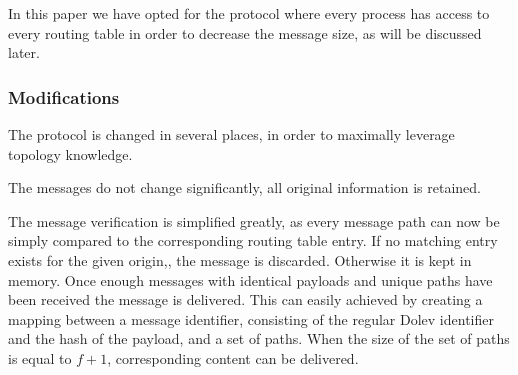 



In this paper we have opted for the protocol where every process has access to every routing table in order to decrease the message size, as will be discussed later.

\subsubsection{Modifications}
The protocol is changed in several places, in order to maximally leverage topology knowledge. 

The messages do not change significantly, all original information is retained.

The message verification is simplified greatly, as every message path can now be simply compared to the corresponding routing table entry. If no matching entry exists for the given origin,, the message is discarded. Otherwise it is kept in memory. Once enough messages with identical payloads and unique paths have been received the message is delivered. This can easily achieved by creating a mapping between a message identifier, consisting of the regular Dolev identifier and the hash of the payload, and a set of paths. When the size of the set of paths is equal to $f+1$, corresponding content can be delivered.

